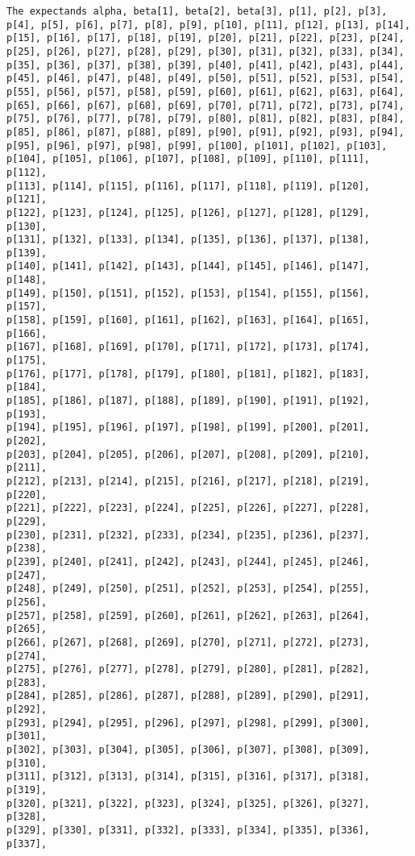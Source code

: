 \documentclass[
  letterpaper,
  DIV=11,
  numbers=noendperiod]{scrartcl}
\begin{document}
\begin{verbatim}
The expectands alpha, beta[1], beta[2], beta[3], p[1], p[2], p[3],
p[4], p[5], p[6], p[7], p[8], p[9], p[10], p[11], p[12], p[13], p[14],
p[15], p[16], p[17], p[18], p[19], p[20], p[21], p[22], p[23], p[24],
p[25], p[26], p[27], p[28], p[29], p[30], p[31], p[32], p[33], p[34],
p[35], p[36], p[37], p[38], p[39], p[40], p[41], p[42], p[43], p[44],
p[45], p[46], p[47], p[48], p[49], p[50], p[51], p[52], p[53], p[54],
p[55], p[56], p[57], p[58], p[59], p[60], p[61], p[62], p[63], p[64],
p[65], p[66], p[67], p[68], p[69], p[70], p[71], p[72], p[73], p[74],
p[75], p[76], p[77], p[78], p[79], p[80], p[81], p[82], p[83], p[84],
p[85], p[86], p[87], p[88], p[89], p[90], p[91], p[92], p[93], p[94],
p[95], p[96], p[97], p[98], p[99], p[100], p[101], p[102], p[103],
p[104], p[105], p[106], p[107], p[108], p[109], p[110], p[111], p[112],
p[113], p[114], p[115], p[116], p[117], p[118], p[119], p[120], p[121],
p[122], p[123], p[124], p[125], p[126], p[127], p[128], p[129], p[130],
p[131], p[132], p[133], p[134], p[135], p[136], p[137], p[138], p[139],
p[140], p[141], p[142], p[143], p[144], p[145], p[146], p[147], p[148],
p[149], p[150], p[151], p[152], p[153], p[154], p[155], p[156], p[157],
p[158], p[159], p[160], p[161], p[162], p[163], p[164], p[165], p[166],
p[167], p[168], p[169], p[170], p[171], p[172], p[173], p[174], p[175],
p[176], p[177], p[178], p[179], p[180], p[181], p[182], p[183], p[184],
p[185], p[186], p[187], p[188], p[189], p[190], p[191], p[192], p[193],
p[194], p[195], p[196], p[197], p[198], p[199], p[200], p[201], p[202],
p[203], p[204], p[205], p[206], p[207], p[208], p[209], p[210], p[211],
p[212], p[213], p[214], p[215], p[216], p[217], p[218], p[219], p[220],
p[221], p[222], p[223], p[224], p[225], p[226], p[227], p[228], p[229],
p[230], p[231], p[232], p[233], p[234], p[235], p[236], p[237], p[238],
p[239], p[240], p[241], p[242], p[243], p[244], p[245], p[246], p[247],
p[248], p[249], p[250], p[251], p[252], p[253], p[254], p[255], p[256],
p[257], p[258], p[259], p[260], p[261], p[262], p[263], p[264], p[265],
p[266], p[267], p[268], p[269], p[270], p[271], p[272], p[273], p[274],
p[275], p[276], p[277], p[278], p[279], p[280], p[281], p[282], p[283],
p[284], p[285], p[286], p[287], p[288], p[289], p[290], p[291], p[292],
p[293], p[294], p[295], p[296], p[297], p[298], p[299], p[300], p[301],
p[302], p[303], p[304], p[305], p[306], p[307], p[308], p[309], p[310],
p[311], p[312], p[313], p[314], p[315], p[316], p[317], p[318], p[319],
p[320], p[321], p[322], p[323], p[324], p[325], p[326], p[327], p[328],
p[329], p[330], p[331], p[332], p[333], p[334], p[335], p[336], p[337],

\end{verbatim}
\end{document}
